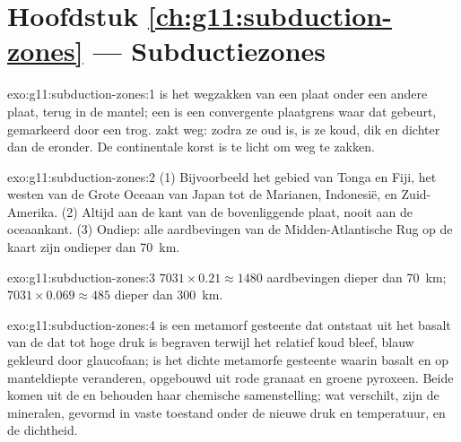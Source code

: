 \section*{Hoofdstuk \ref{ch:g11:subduction-zones} --- Subductiezones}

\begin{solution}{exo:g11:subduction-zones:1}
 is het wegzakken van een plaat  onder een andere
plaat, terug in de mantel; een  is een convergente plaatgrens
waar dat gebeurt, gemarkeerd door een trog.  zakt weg: zodra ze
oud is, is ze koud, dik en dichter dan de  eronder. De
continentale korst is te licht om weg te zakken.
\end{solution}

\begin{solution}{exo:g11:subduction-zones:2}
(1) Bijvoorbeeld het gebied van Tonga en Fiji, het westen van de Grote Oceaan van Japan tot de
Marianen, Indonesië, en Zuid-Amerika. (2) Altijd aan de kant van de
bovenliggende plaat, nooit aan de oceaankant. (3) Ondiep: alle aardbevingen van
de Midden-Atlantische Rug op de kaart zijn ondieper dan \qty{70}{km}.
\end{solution}

\begin{solution}{exo:g11:subduction-zones:3}
$7031 \times 0.21 \approx 1480$ aardbevingen dieper dan \qty{70}{km};
$7031 \times 0.069 \approx 485$ dieper dan \qty{300}{km}.
\end{solution}

\begin{solution}{exo:g11:subduction-zones:4}
 is een metamorf gesteente dat ontstaat uit het basalt van de 
dat tot hoge druk is begraven terwijl het relatief koud bleef, blauw gekleurd door
glaucofaan;  is het dichte metamorfe gesteente waarin basalt en 
op manteldiepte veranderen, opgebouwd uit rode granaat en groene pyroxeen. Beide komen uit
de  en behouden haar chemische samenstelling; wat verschilt, zijn de
mineralen, gevormd in vaste toestand onder de nieuwe druk en temperatuur,
en de dichtheid.
\end{solution}


